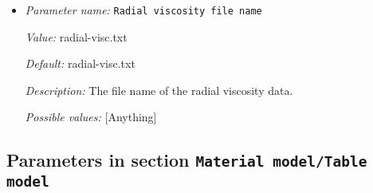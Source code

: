 \begin{itemize}
{\it Default:} pyr-ringwood88.txt


{\it Description:} The file names of the material data. List with as many components as activecompositional fields (material data is assumed tobe in order with the ordering of the fields). 


{\it Possible values:} [List list of <[Anything]> of length 0...4294967295 (inclusive)]
\item {\it Parameter name:} {\tt Radial viscosity file name}


{\it Value:} radial-visc.txt


{\it Default:} radial-visc.txt


{\it Description:} The file name of the radial viscosity data. 


{\it Possible values:} [Anything]
\end{itemize}

\subsection{Parameters in section \tt Material model/Table model}
\label{parameters:Material_20model/Table_20model}

